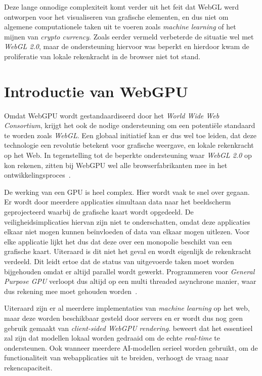 \bigbreak{}

Deze lange onnodige complexiteit komt verder uit het feit dat WebGL werd ontworpen voor het visualiseren van grafische elementen, en dus niet om algemene computationele taken uit te voeren zoals \textit{machine learning} of het mijnen van \textit{crypto currency}. Zoals eerder vermeld verbeterde de situatie wel met \textit{WebGL 2.0}, maar de ondersteuning hiervoor was beperkt en hierdoor kwam de proliferatie van lokale rekenkracht in de browser niet tot stand.

\break{}

\section{Introductie van WebGPU}

Omdat WebGPU wordt gestandaardiseerd door het \textit{World Wide Web Consortium}, krijgt het ook de nodige ondersteuning om een potentiële standaard te worden zoals \textit{WebGL}. Een globaal initiatief kan er dus wel toe leiden, dat deze technologie een revolutie betekent voor grafische weergave, en lokale rekenkracht op het Web. In tegenstelling tot de beperkte ondersteuning waar \textit{WebGL 2.0} op kon rekenen, zitten bij WebGPU wel alle browserfabrikanten mee in het ontwikkelingsproces~\autocite{Surma2022}.

\bigbreak{}

De werking van een GPU is heel complex. Hier wordt vaak te snel over gegaan. Er wordt door meerdere applicaties simultaan data naar het beeldscherm geprojecteerd waarbij de grafische kaart wordt opgedeeld. De veiligheidsimplicaties hiervan zijn niet te onderschatten, omdat deze applicaties elkaar niet mogen kunnen beïnvloeden of data van elkaar mogen uitlezen. Voor elke applicatie lijkt het dus dat deze over een monopolie beschikt van een grafische kaart. Uiteraard is dit niet het geval en wordt eigenlijk de rekenkracht verdeeld. Dit leidt ertoe dat de status van uitgevoerde taken moet worden bijgehouden omdat er altijd parallel wordt gewerkt. Programmeren voor \textit{General Purpose GPU} verloopt dus altijd op een multi threaded asynchrone manier, waar dus rekening mee moet gehouden worden~\autocite{Surma2022}.

\bigbreak{}

Uiteraard zijn er al meerdere implementaties van \textit{machine learning} op het web, maar deze worden beschikbaar gesteld door servers en er wordt dus nog geen gebruik gemaakt van \textit{client-sided WebGPU rendering}. \textcite{Fleetwood2023a} beweert dat het essentieel zal zijn dat modellen lokaal worden gedraaid om de echte \textit{real-time} te ondersteunen. Ook wanneer meerdere AI-modellen serieel worden gebruikt, om de functionaliteit van webapplicaties uit te breiden, verhoogt de vraag naar rekencapaciteit.

